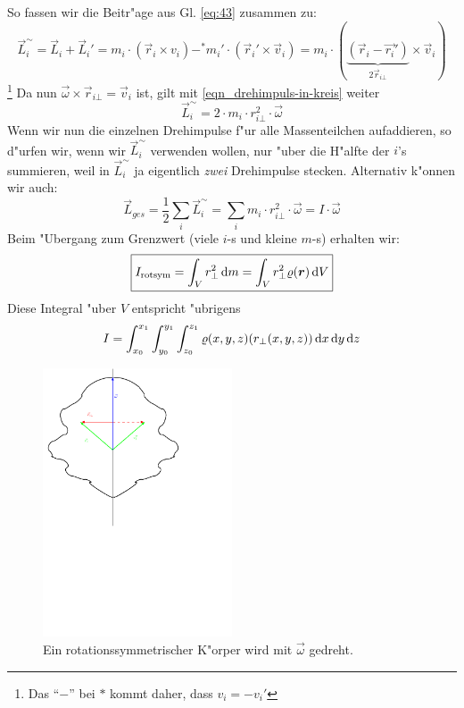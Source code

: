  So fassen wir die
Beitr"age aus Gl. \eqref{eq:43} zusammen zu:
\begin{equation}
   \label{eq:45}
   \vec L_i^\sim = 
\vec L_i + \vec L_i' = 
m_i \cdot (\vec r_i \times v_i ) \mathbf{-}^\ast m_i' \cdot (\vec r_i'
\times \vec v_i) =
m_i \cdot ( \underbrace{(\vec r_i - \vec{r_i}')}_{2\vec r_{i\bot}} \times \vec
v_i)
\end{equation}
\footnote{Das "`$\mathbf -$"' bei $\ast$ kommt daher, dass $v_i =
  -v_i'$} Da nun $\vec\omega \times \vec r_{i\bot} = \vec v_i$ ist, gilt
mit \eqref{eqn_drehimpuls-in-kreis} weiter
\begin{equation}
   \label{eq:46}
      \vec L_i^\sim = 2 \cdot m_i \cdot r_{i\bot}^2 \cdot \vec \omega
\end{equation}
Wenn wir nun die einzelnen Drehimpulse f"ur alle Massenteilchen
aufaddieren, so d"urfen wir, wenn wir $\vec L_i^\sim $ verwenden
wollen, nur "uber die H"alfte der $i$'s summieren, weil in $\vec L_i^\sim
$ ja eigentlich \emph{zwei} Drehimpulse stecken. Alternativ k"onnen wir auch:
\begin{equation}
   \label{eq:47}
   \vec L_{ges} = \frac{1}{2} \sum_i \vec L_i^\sim  = \sum_i m_i \cdot
   r_{i\bot}^2 \cdot \vec \omega = I \cdot \vec \omega
\end{equation}
Beim "Ubergang zum Grenzwert (viele $i$-s und kleine $m$-s) erhalten wir:
\begin{equation}
   \label{eqn_I_rotsym}
\boxed{
   I_\text{rotsym} = \int_V r_\bot^2 \, \mathrm{d} m = \int_V r_\bot^2 \varrho(\boldsymbol{r})
\, \mathrm{d}
   V
}
\end{equation}
Diese Integral "uber $V$ entspricht "ubrigens
$$
I = \int_{x_0}^{x_1} \int_{y_0}^{y_1} \int_{z_0}^{z_1} \varrho(x,y,z)
(r_\bot(x,y,z)) \, \mathrm{d} x \, \mathrm{d} y \, \mathrm{d} z
$$


\begin{figure}
\centering
   \includegraphics[width=0.5\textwidth]{bilder/rotsym}
   \caption[Drehung: Rotationssymmetrischer Körper]{Ein
     rotationssymmetrischer K"orper wird mit $\vec \omega$ gedreht.}
   \label{abb_rotsym}
\end{figure}




